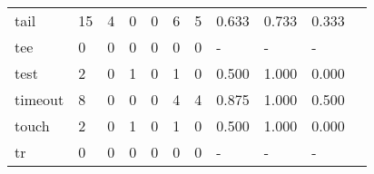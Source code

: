 \begin{longtable}{lp{1.2cm}p{1.2cm}p{1.2cm}p{1.2cm}p{1.2cm}p{1.2cm}p{1.2cm}p{1.2cm}p{1.2cm}p{1.2cm}}
tail      &                                    15 &                                                  4 &                                                0 &                                               0 &                                                6 &                                              5 &                                              0.633 &                                              0.733 &                                              0.333 \\
tee       &                                     0 &                                                  0 &                                                0 &                                               0 &                                                0 &                                              0 &                                                  - &                                                  - &                                                  - \\
test      &                                     2 &                                                  0 &                                                1 &                                               0 &                                                1 &                                              0 &                                              0.500 &                                              1.000 &                                              0.000 \\
timeout   &                                     8 &                                                  0 &                                                0 &                                               0 &                                                4 &                                              4 &                                              0.875 &                                              1.000 &                                              0.500 \\
touch     &                                     2 &                                                  0 &                                                1 &                                               0 &                                                1 &                                              0 &                                              0.500 &                                              1.000 &                                              0.000 \\
tr        &                                     0 &                                                  0 &                                                0 &                                               0 &                                                0 &                                              0 &                                                  - &                                                  - &                                                  - \\

\end{longtable}
